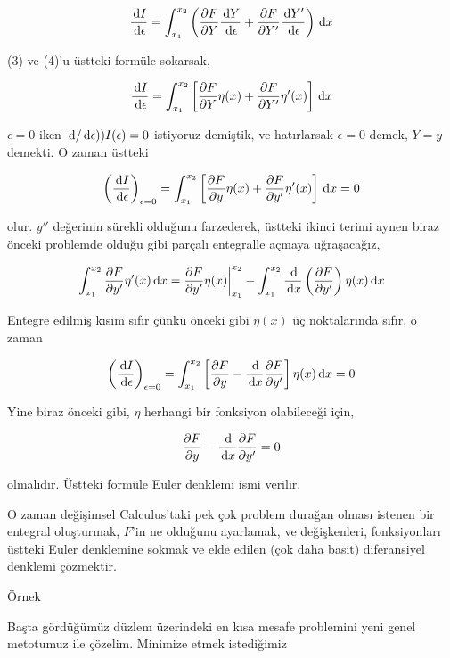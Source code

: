 \documentclass[12pt,fleqn]{article}\usepackage{../../common}
\begin{document}
$$
\frac{\,\mathrm{d} I}{\,\mathrm{d} \epsilon}  = 
\int _{x_1}^{x_2} \left(
\frac{\partial F}{\partial Y} \frac{\,\mathrm{d} Y}{\,\mathrm{d} \epsilon} + 
\frac{\partial F}{\partial Y'} \frac{\,\mathrm{d} Y'}{\,\mathrm{d} \epsilon} 
\right) \,\mathrm{d} x
$$

(3) ve (4)'u üstteki formüle sokarsak, 

$$
\frac{\,\mathrm{d} I}{\,\mathrm{d} \epsilon}  = 
\int _{x_1}^{x_2}
\left[
\frac{\partial F}{\partial Y} \eta(x) + 
\frac{\partial F}{\partial Y'} \eta'(x) 
\right] \,\mathrm{d} x
$$

$\epsilon = 0$ iken $ \,\mathrm{d} / \,\mathrm{d} \epsilon) ) I(\epsilon) = 0$ istiyoruz
demiştik, ve hatırlarsak $\epsilon = 0$ demek, $Y = y$ demekti. O zaman
üstteki 

$$
\left( \frac{\,\mathrm{d} I}{\,\mathrm{d} \epsilon} \right)_{\epsilon = 0} = 
\int _{x_1}^{x_2}
\left[
\frac{\partial F}{\partial y} \eta(x) + 
\frac{\partial F}{\partial y'} \eta'(x) 
\right] \,\mathrm{d} x = 0
$$

olur. $y''$ değerinin sürekli olduğunu farzederek, üstteki ikinci terimi
aynen biraz önceki problemde olduğu gibi parçalı entegralle açmaya
uğraşacağız,

$$
\int _{x_1}^{x_2} \frac{\partial F}{\partial y'} \eta'(x) \,\mathrm{d} x = 
\frac{\partial F}{\partial y'} \eta(x) \bigg\vert _{x_1}^{x_2} - 
\int _{x_1}^{x_2} \frac{\,\mathrm{d} }{\,\mathrm{d} x} \left( \frac{\partial F}{\partial y'}  \right)
\eta(x) \,\mathrm{d} x
$$

Entegre edilmiş kısım sıfır çünkü önceki gibi $\eta(x)$ üç noktalarında
sıfır, o zaman 

$$
\left( \frac{\,\mathrm{d} I}{\,\mathrm{d} \epsilon} \right)_{\epsilon = 0} = 
\int _{x_1}^{x_2} \left[
\frac{\partial F}{\partial y} - 
\frac{\,\mathrm{d} }{\,\mathrm{d} x} \frac{\partial F}{\partial y'}
\right] \eta(x) \,\mathrm{d} x = 0
$$

Yine biraz önceki gibi, $\eta$ herhangi bir fonksiyon olabileceği için,

$$
\frac{\partial F}{\partial y} - 
\frac{\,\mathrm{d} }{\,\mathrm{d} x} \frac{\partial F}{\partial y'} = 0
$$

olmalıdır. Üstteki formüle Euler denklemi ismi verilir. 

O zaman değişimsel Calculus'taki pek çok problem durağan olması istenen bir
entegral oluşturmak, $F$'in ne olduğunu ayarlamak, ve değişkenleri,
fonksiyonları üstteki Euler denklemine sokmak ve elde edilen (çok daha
basit) diferansiyel denklemi çözmektir.

Örnek

Başta gördüğümüz düzlem üzerindeki en kısa mesafe problemini yeni genel
metotumuz ile çözelim. Minimize etmek istediğimiz
\end{document}
